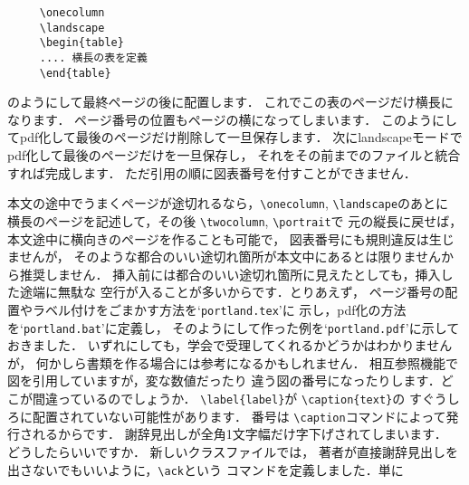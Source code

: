 \documentclass[onecolumn]{jsce}  %
\begin{document}
\begin{Enumerate}
\renewcommand{\baselinestretch}{0.75}\small\normalsize
\begin{verbatim}
     \onecolumn
     \landscape
     \begin{table}
     .... 横長の表を定義
     \end{table}
\end{verbatim}
\renewcommand{\baselinestretch}{1}\small\normalsize
のようにして最終ページの後に配置します．
これでこの表のページだけ横長になります．
ページ番号の位置もページの横になってしまいます．
このようにしてpdf化して最後のページだけ削除して一旦保存します．
次にlandscapeモードでpdf化して最後のページだけを一旦保存し，
それをその前までのファイルと統合すれば完成します．
ただ引用の順に図表番号を付すことができません．

本文の途中でうまくページが途切れるなら，\verb+\onecolumn+,
 \verb+\landscape+のあとに
横長のページを記述して，その後 \verb+\twocolumn+, \verb+\portrait+で
元の縦長に戻せば，本文途中に横向きのページを作ることも可能で，
図表番号にも規則違反は生じませんが，
そのような都合のいい途切れ箇所が本文中にあるとは限りませんから推奨しません．
挿入前には都合のいい途切れ箇所に見えたとしても，挿入した途端に無駄な
空行が入ることが多いからです．とりあえず，
ページ番号の配置やラベル付けをごまかす方法を`{\tt portland.tex}'に
示し，pdf化の方法を`{\tt portland.bat}'に定義し，
そのようにして作った例を`{\tt portland.pdf}'に示しておきました．
いずれにしても，学会で受理してくれるかどうかはわかりませんが，
何かしら書類を作る場合には参考になるかもしれません．
%
\Qitem 相互参照機能で図を引用していますが，変な数値だったり
違う図の番号になったりします．どこが間違っているのでしょうか．
\Aitem \verb+\label{label}+が \verb+\caption{text}+の
すぐうしろに配置されていない可能性があります．
番号は \verb+\caption+コマンドによって発行されるからです．
%
\Qitem 謝辞見出しが全角1文字幅だけ字下げされてしまいます．
どうしたらいいですか．
\Aitem 新しいクラスファイルでは，
著者が直接謝辞見出しを出さないでもいいように，\verb+\ack+という
コマンドを定義しました．単に


\end{Enumerate}
\end{document}
